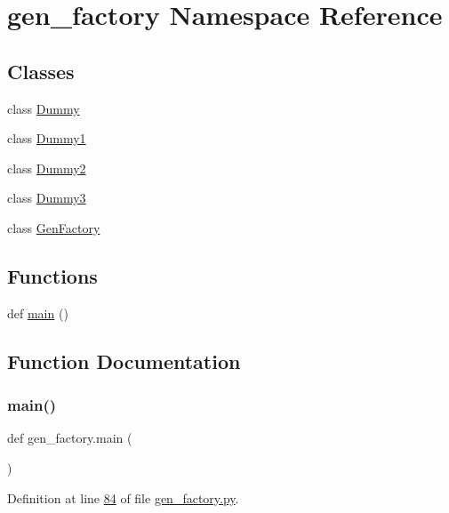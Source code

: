 \hypertarget{namespacegen__factory}{}\section{gen\+\_\+factory Namespace Reference}
\label{namespacegen__factory}
\subsection*{Classes}
\begin{DoxyCompactItemize}
\item 
class \hyperlink{classgen__factory_1_1_dummy}{Dummy}
\item 
class \hyperlink{classgen__factory_1_1_dummy1}{Dummy1}
\item 
class \hyperlink{classgen__factory_1_1_dummy2}{Dummy2}
\item 
class \hyperlink{classgen__factory_1_1_dummy3}{Dummy3}
\item 
class \hyperlink{classgen__factory_1_1_gen_factory}{Gen\+Factory}
\end{DoxyCompactItemize}
\subsection*{Functions}
\begin{DoxyCompactItemize}
\item 
def \hyperlink{namespacegen__factory_a785bd40533dd477ffff224d65ba1c5c3}{main} ()
\end{DoxyCompactItemize}


\subsection{Function Documentation}
\mbox{\label{namespacegen__factory_a785bd40533dd477ffff224d65ba1c5c3}} 
\subsubsection{\texorpdfstring{main()}{main()}}
{\footnotesize\ttfamily def gen\+\_\+factory.\+main (\begin{DoxyParamCaption}{ }\end{DoxyParamCaption})}



Definition at line \hyperlink{gen__factory_8py_source_l00084}{84} of file \hyperlink{gen__factory_8py_source}{gen\+\_\+factory.\+py}.



